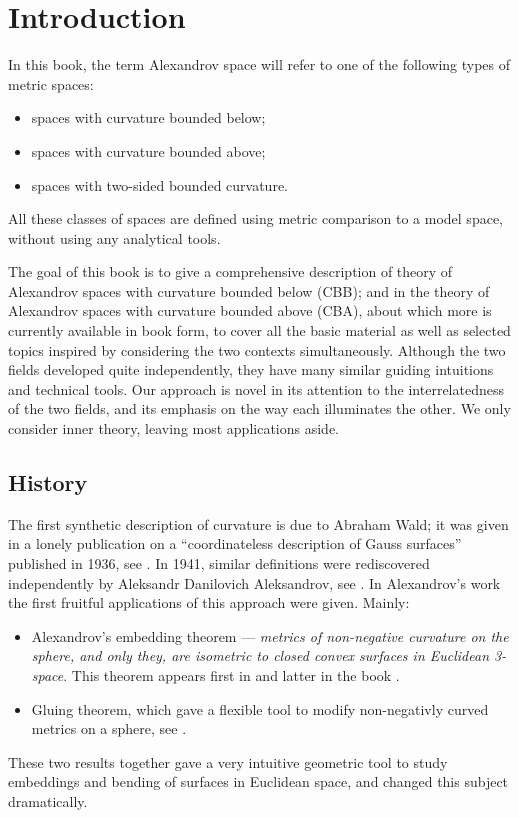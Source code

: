 \chapter*{Introduction}

In this book, the term Alexandrov space will refer to one of the following types of %
metric spaces:
\begin{itemize}
\item spaces with curvature bounded below;
\item spaces with curvature bounded above;
\item spaces with two-sided bounded curvature.
\end{itemize}
All these classes of spaces are defined using metric comparison to a model space, without using any analytical tools. 

The goal of this book is to give a comprehensive description of theory of Alexandrov spaces with curvature bounded below (CBB);  and in the theory of Alexandrov spaces with curvature bounded above (CBA), about which more is currently available in book form, to cover all the basic material as well as selected topics inspired by considering the two contexts simultaneously.  Although the two fields developed quite independently, they have many similar guiding intuitions and technical tools.  Our approach is novel in its attention to the interrelatedness of the two fields, and its emphasis on the way each illuminates the other.  We only consider inner theory, leaving most applications aside.


\section*{History}

The first synthetic description of curvature is due to Abraham Wald; 
it was given in a lonely publication on a ``coordinateless description of Gauss surfaces'' published in 1936, see \cite{wald}.
In 1941, similar definitions were rediscovered independently by Aleksandr Danilovich Aleksandrov,
see \cite{alexandrov:def}.
In Alexandrov's work the first fruitful applications of this approach were given.
Mainly:
\begin{itemize}
\item Alexandrov's embedding theorem  --- 
\textit{metrics of non-negative curvature on the sphere, and only they, are isometric to closed convex surfaces in Euclidean 3-space}. This theorem appears first in \cite{alexandrov:def} and latter in the book \cite{alexandrov-embedding}.
\item Gluing theorem, which gave a flexible tool to modify non-negativly curved metrics on a sphere, see \cite{alexandrov-glueing}.
\end{itemize}
These two results together gave  a very intuitive geometric tool to study embeddings and bending of surfaces in Euclidean space, and changed this subject dramatically.

